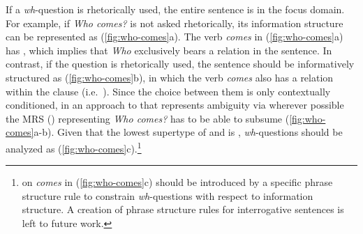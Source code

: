 If a \textit{wh}-question is rhetorically used, the entire sentence is
in the focus domain. For example, if \textit{Who comes?} is not asked
rhetorically, its information structure can be represented as
(\ref{fig:who-comes}a). The verb \textit{comes} in
(\ref{fig:who-comes}a) has , which implies that \textit{Who}
exclusively bears a  relation in the sentence. In contrast, if
the question is rhetorically used, the sentence should be
informatively structured as (\ref{fig:who-comes}b), in which the verb
\textit{comes} also has a  relation within the clause
(i.e.\ ). Since the choice between them is only
contextually conditioned, in an approach to 
that represents ambiguity via  wherever possible the
MRS (\citealt{copestake:etal:05}) representing \textit{Who comes?} has
to be able to subsume (\ref{fig:who-comes}a-b). Given that the
lowest supertype of  and  is ,
\textit{wh}-questions should be analyzed as
(\ref{fig:who-comes}c).\footnote{ on \textit{comes} in
  (\ref{fig:who-comes}c) should be introduced by a specific phrase
  structure rule to constrain \textit{wh}-questions with respect to
  information structure.  A creation of phrase structure rules for
  interrogative sentences is left to future work.}








